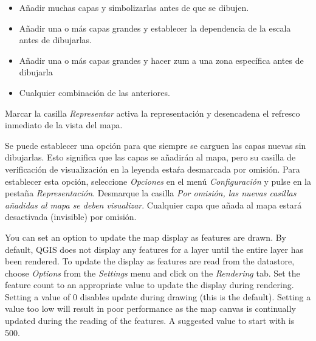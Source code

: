 \begin{itemize}
\item Añadir muchas capas y simbolizarlas antes de que se dibujen.
\item Añadir una o más capas grandes y establecer la dependencia de la escala antes de dibujarlas.
\item Añadir una o más capas grandes y hacer zum a una zona específica antes de dibujarla
\item Cualquier combinación de las anteriores.
\end{itemize}

Marcar la casilla \textit{Representar} activa la representación y desencadena el refresco inmediato de la vista del mapa.

\label{label_settinglayer}

Se puede establecer una opción para que siempre se carguen las capas nuevas sin dibujarlas. Esto
significa que las capas se añadirán al mapa, pero su casilla de verificación de visualización en la leyenda estaŕa 
desmarcada por omisión. Para establecer esta opción, seleccione \textit{Opciones} en el menú \textit{Configuración} 
y pulse en la pestaña \textit{Representación}. Desmarque la casilla \textit{Por omisión, las nuevas casillas añadidas 
al mapa se deben visualizar}. Cualquier capa que añada al mapa estará desactivada (invisible) por omisión.

%
%

\label{label_updatemap}

You can set an option to update the map display as features are drawn. By
default, QGIS does not display any features for a layer until the entire
layer has been rendered. To update the display as features are read from the
datastore, choose \textit{Options} from the \textit{Settings} menu and
click on the \textit{Rendering} tab. Set the feature count to an
appropriate value to update the display during rendering. Setting a value of 0
disables update during drawing (this is the default). Setting a value too low
will result in poor performance as the map canvas is continually updated
during the reading of the features. A suggested value to start with is 500. 

